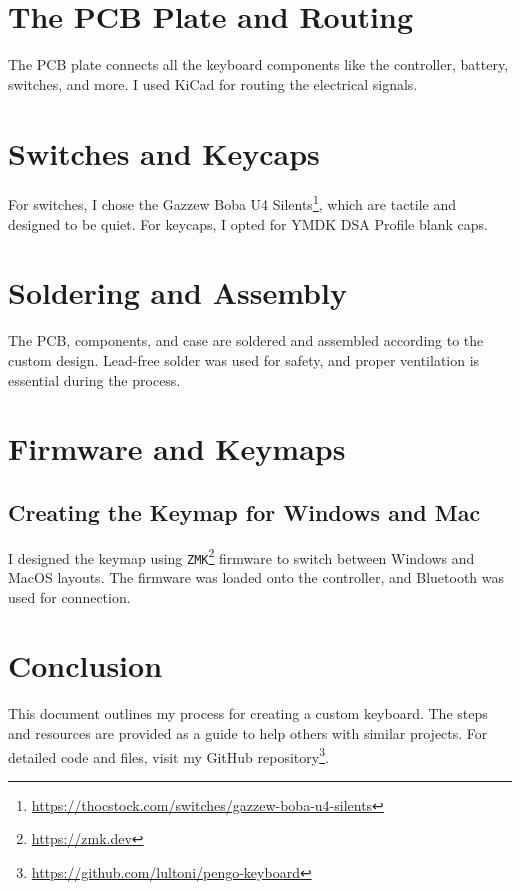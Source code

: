 \documentclass[a4paper,12pt]{article}
\begin{document}
\section{The PCB Plate and Routing}
The PCB plate connects all the keyboard components like the controller, battery, switches, and more. I used KiCad for routing the electrical signals.

\section{Switches and Keycaps}
For switches, I chose the Gazzew Boba U4 Silents\footnote{\url{https://thocstock.com/switches/gazzew-boba-u4-silents}}, which are tactile and designed to be quiet. For keycaps, I opted for YMDK DSA Profile blank caps.

\section{Soldering and Assembly}
The PCB, components, and case are soldered and assembled according to the custom design. Lead-free solder was used for safety, and proper ventilation is essential during the process.

\section{Firmware and Keymaps}
\subsection{Creating the Keymap for Windows and Mac}
I designed the keymap using \texttt{ZMK}\footnote{\url{https://zmk.dev}} firmware to switch between Windows and MacOS layouts. The firmware was loaded onto the controller, and Bluetooth was used for connection.

\section{Conclusion}
This document outlines my process for creating a custom keyboard. The steps and resources are provided as a guide to help others with similar projects. For detailed code and files, visit my GitHub repository\footnote{\url{https://github.com/lultoni/pengo-keyboard}}.
\end{document}
